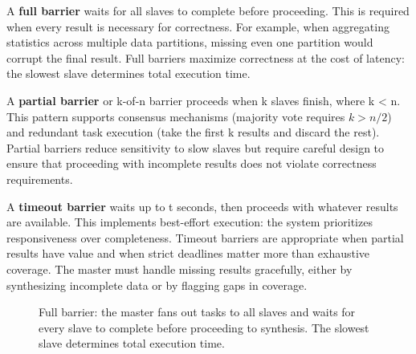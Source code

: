 A \textbf{full barrier} waits for all slaves to complete before proceeding. This is required when every result is necessary for correctness. For example, when aggregating statistics across multiple data partitions, missing even one partition would corrupt the final result. Full barriers maximize correctness at the cost of latency: the slowest slave determines total execution time.

A \textbf{partial barrier} or k-of-n barrier proceeds when k slaves finish, where k < n. This pattern supports consensus mechanisms (majority vote requires $k > n/2$) and redundant task execution (take the first k results and discard the rest). Partial barriers reduce sensitivity to slow slaves but require careful design to ensure that proceeding with incomplete results does not violate correctness requirements.

A \textbf{timeout barrier} waits up to t seconds, then proceeds with whatever results are available. This implements best-effort execution: the system prioritizes responsiveness over completeness. Timeout barriers are appropriate when partial results have value and when strict deadlines matter more than exhaustive coverage. The master must handle missing results gracefully, either by synthesizing incomplete data or by flagging gaps in coverage.

\begin{figure}[t]
\centering
{}
\caption{Full barrier: the master fans out tasks to all slaves and waits for every slave to complete before proceeding to synthesis. The slowest slave determines total execution time.}
\label{fig:barrier_full}
\end{figure}


